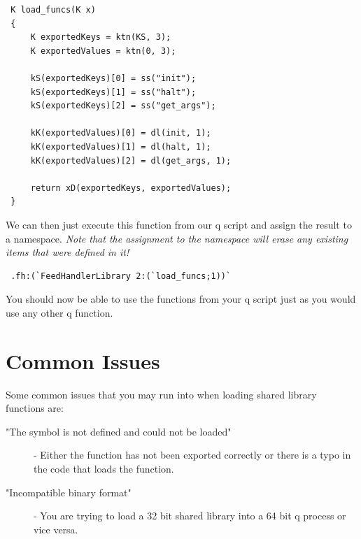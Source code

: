  \begin{lstlisting}
 K load_funcs(K x)
 {
	 K exportedKeys = ktn(KS, 3);
	 K exportedValues = ktn(0, 3);
 
	 kS(exportedKeys)[0] = ss("init");
	 kS(exportedKeys)[1] = ss("halt");
	 kS(exportedKeys)[2] = ss("get_args");
 
	 kK(exportedValues)[0] = dl(init, 1);
	 kK(exportedValues)[1] = dl(halt, 1);
	 kK(exportedValues)[2] = dl(get_args, 1);
 
	 return xD(exportedKeys, exportedValues);
 }
 \end{lstlisting}
 
 We can then just execute this function from our q script and assign the result to a namespace. \textit{Note that the assignment to the namespace will erase any existing items that were defined in it!}
 
 \begin{lstlisting}
 .fh:(`FeedHandlerLibrary 2:(`load_funcs;1))`
 \end{lstlisting}
 
 You should now be able to use the functions from your q script just as you would use any other q function. 
 
 \section{Common Issues}
 
 Some common issues that you may run into when loading shared library functions are:
 
 \begin{description}
 	\item["The symbol is not defined and could not be loaded"] - Either the function has not been exported correctly or there is a typo in the code that loads the function.
 	
 	\item["Incompatible binary format"] - You are trying to load a 32 bit shared library into a 64 bit q process or vice versa.
 \end{description}